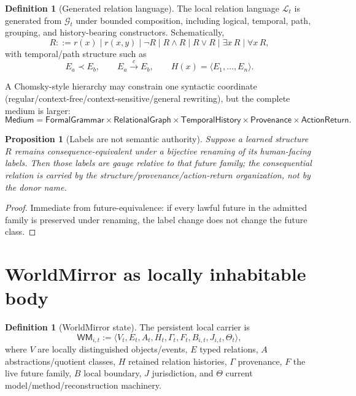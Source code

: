 \documentclass[10pt]{article}
\theoremstyle{venus}
\newtheorem{proposition}[theorem]{Proposition}
\theoremstyle{definition}
\newtheorem{definition}[theorem]{Definition}
\newcommand{\WM}{\mathsf{WM}}
\begin{document}
\begin{definition}[Generated relation language]
The local relation language $\mathcal L_t$ is generated from $\mathcal G_t$
under bounded composition, including logical, temporal, path, grouping, and
history-bearing constructors. Schematically,
\[
R ::= r(x)\mid r(x,y)\mid \neg R\mid R\wedge R\mid R\vee R
\mid \exists x\,R\mid \forall x\,R,
\]
with temporal/path structure such as
\[
E_a\prec E_b,
\qquad
E_a\xrightarrow{c}E_b,
\qquad
H(x)=\langle E_1,\dots,E_n\rangle.
\]
\end{definition}

A Chomsky-style hierarchy may constrain one syntactic coordinate
(regular/context-free/context-sensitive/general rewriting), but the complete
medium is larger:
\begin{equation}\label{eq:medium}
\boxed{
\mathsf{Medium}
=
\mathsf{FormalGrammar}
\times\mathsf{RelationalGraph}
\times\mathsf{TemporalHistory}
\times\mathsf{Provenance}
\times\mathsf{ActionReturn}.
}
\end{equation}

\begin{proposition}[Labels are not semantic authority]
Suppose a learned structure $R$ remains consequence-equivalent under a
bijective renaming of its human-facing labels. Then those labels are gauge
relative to that future family; the consequential relation is carried by the
structure/provenance/action-return organization, not by the donor name.
\end{proposition}
\begin{proof}
Immediate from future-equivalence: if every lawful future in the admitted
family is preserved under renaming, the label change does not change the
future class.
\end{proof}

\section{WorldMirror as locally inhabitable body}

\begin{definition}[WorldMirror state]
The persistent local carrier is
\begin{equation}\label{eq:wm}
\WM_{i,t}
:=
\langle
V_t,E_t,A_t,H_t,\Gamma_t,F_t,B_{i,t},J_{i,t},\Theta_t
\rangle,
\end{equation}
where $V$ are locally distinguished objects/events, $E$ typed relations, $A$
abstractions/quotient classes, $H$ retained relation histories, $\Gamma$
provenance, $F$ the live future family, $B$ local boundary, $J$ jurisdiction,
and $\Theta$ current model/method/reconstruction machinery.
\end{definition}
\end{document}
